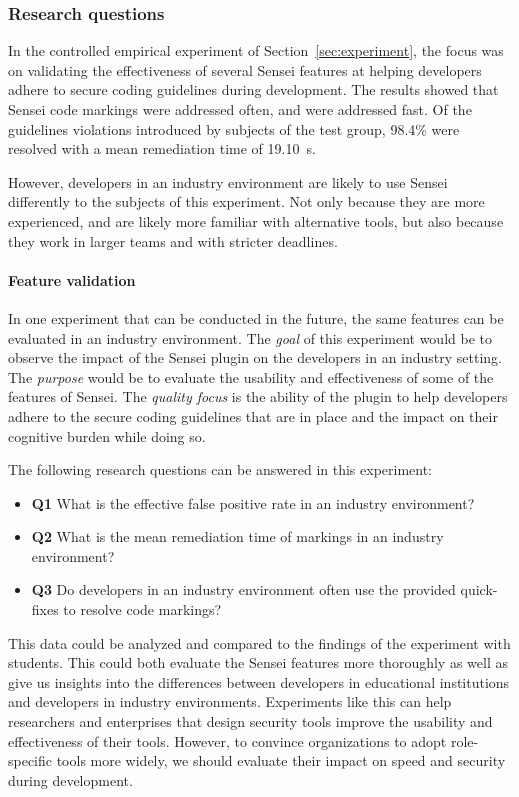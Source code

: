 \subsubsection{Research questions}
In the controlled empirical experiment of Section~\ref{sec:experiment}, the focus was on validating the effectiveness of several Sensei features at helping developers adhere to secure coding guidelines during development.
The results showed that Sensei code markings were addressed often, and were addressed fast. 
Of the guidelines violations introduced by subjects of the test group, 98.4\% were resolved with a mean remediation time of 19.10~s.

However, developers in an industry environment are likely to use Sensei differently to the subjects of this experiment.
Not only because they are more experienced, and are likely more familiar with alternative tools, but also because they work in larger teams and with stricter deadlines.


\paragraph{Feature validation}
In one experiment that can be conducted in the future, the same features can be evaluated in an industry environment.
The \textit{goal} of this experiment would be to observe the impact of the Sensei plugin on the developers in an industry setting.
The \textit{purpose} would be to evaluate the usability and effectiveness of some of the features of Sensei.
The \textit{quality focus} is the ability of the plugin to help developers adhere to the secure coding guidelines that are in place and the impact on their cognitive burden while doing so.

The following research questions can be answered in this experiment:
\begin{itemize}
    \item \textbf{Q1} What is the effective false positive rate in an industry environment?
    \item \textbf{Q2} What is the mean remediation time of markings in an industry environment?
    \item \textbf{Q3} Do developers in an industry environment often use the provided quick-fixes to resolve code markings?
\end{itemize}

This data could be analyzed and compared to the findings of the experiment with students.
This could both evaluate the Sensei features more thoroughly as well as give us insights into the differences between developers in educational institutions and developers in industry environments.
Experiments like this can help researchers and enterprises that design security tools improve the usability and effectiveness of their tools.
However, to convince organizations to adopt role-specific tools more widely, we should evaluate their impact on speed and security during development.

